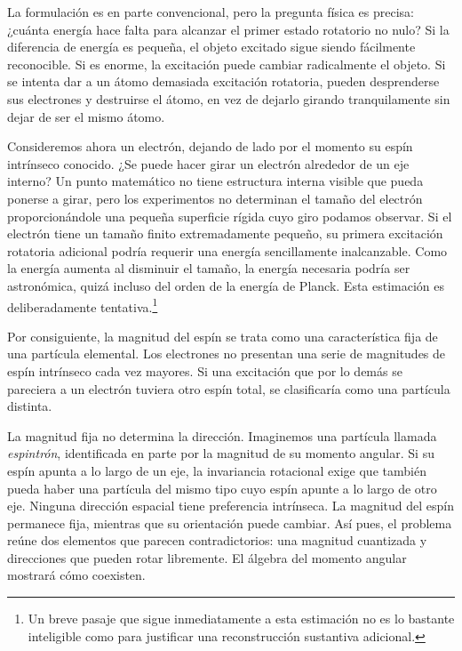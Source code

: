 La formulación es en parte convencional, pero la pregunta física es precisa: ¿cuánta energía hace falta para alcanzar el primer estado rotatorio no nulo? Si la diferencia de energía es pequeña, el objeto excitado sigue siendo fácilmente reconocible. Si es enorme, la excitación puede cambiar radicalmente el objeto. Si se intenta dar a un átomo demasiada excitación rotatoria, pueden desprenderse sus electrones y destruirse el átomo, en vez de dejarlo girando tranquilamente sin dejar de ser el mismo átomo.

Consideremos ahora un electrón, dejando de lado por el momento su espín intrínseco conocido. ¿Se puede hacer girar un electrón alrededor de un eje interno? Un punto matemático no tiene estructura interna visible que pueda ponerse a girar, pero los experimentos no determinan el tamaño del electrón proporcionándole una pequeña superficie rígida cuyo giro podamos observar. Si el electrón tiene un tamaño finito extremadamente pequeño, su primera excitación rotatoria adicional podría requerir una energía sencillamente inalcanzable. Como la energía aumenta al disminuir el tamaño, la energía necesaria podría ser astronómica, quizá incluso del orden de la energía de Planck. Esta estimación es deliberadamente tentativa.\footnote{Un breve pasaje que sigue inmediatamente a esta estimación no es lo bastante inteligible como para justificar una reconstrucción sustantiva adicional.}

Por consiguiente, la magnitud del espín se trata como una característica fija de una partícula elemental. Los electrones no presentan una serie de magnitudes de espín intrínseco cada vez mayores. Si una excitación que por lo demás se pareciera a un electrón tuviera otro espín total, se clasificaría como una partícula distinta.

La magnitud fija no determina la dirección. Imaginemos una partícula llamada \emph{espintrón}, identificada en parte por la magnitud de su momento angular. Si su espín apunta a lo largo de un eje, la invariancia rotacional exige que también pueda haber una partícula del mismo tipo cuyo espín apunte a lo largo de otro eje. Ninguna dirección espacial tiene preferencia intrínseca. La magnitud del espín permanece fija, mientras que su orientación puede cambiar. Así pues, el problema reúne dos elementos que parecen contradictorios: una magnitud cuantizada y direcciones que pueden rotar libremente. El álgebra del momento angular mostrará cómo coexisten.

